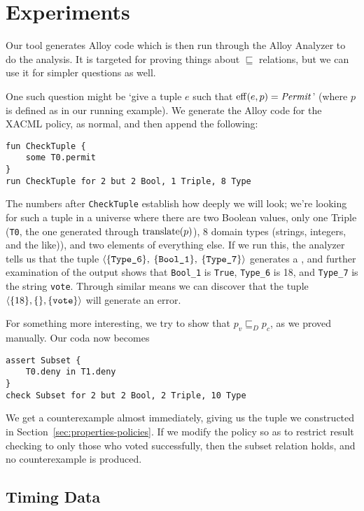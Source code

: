 \section{Experiments}
\label{sec:experiments}

Our tool generates Alloy code which is then run through the Alloy
Analyzer to do the analysis.  It is targeted for proving things about
$\sqsubseteq$ relations, but we can use it for simpler questions as
well.

One such question might be `give a tuple $e$ such that $\operatorname{eff} (e, p) =
\text{\textit{Permit}}$' (where $p$ is defined as in our running example).  We
generate the Alloy code for the XACML policy, as normal, and then
append the following:
\begin{verbatim}
fun CheckTuple {
    some T0.permit
}
run CheckTuple for 2 but 2 Bool, 1 Triple, 8 Type
\end{verbatim}
The numbers after \texttt{CheckTuple} establish how deeply we will
look; we're looking for such a tuple in a universe where there are two
Boolean values, only one Triple (\texttt{T0}, the one generated
through $\operatorname{translate}(p)$), 8 domain types (strings, integers, and the
like)), and two elements of everything else.  If we run this, the
analyzer tells us that the tuple $\langle \{ \text{\texttt{Type\_6}} \},$ $\{
\text{\texttt{Bool\_1}} \},$ $\{ \text{\texttt{Type\_7}} \} \rangle$ generates a
\Permit{}, and further examination of the output shows that
\texttt{Bool\_1} is \texttt{True}, \texttt{Type\_6} is 18, and
\texttt{Type\_7} is the string \texttt{vote}.  Through similar means
we can discover that the tuple $\langle \{ 18 \}, \{ \}, \{ \text{\texttt{vote}}
\} \rangle$ will generate an error.

For something more interesting, we try to show that $p_v \sqsubseteq_D
p_c$, as we proved manually.  Our coda now becomes
\begin{verbatim}
assert Subset {
    T0.deny in T1.deny
}
check Subset for 2 but 2 Bool, 2 Triple, 10 Type
\end{verbatim}
We get a counterexample almost immediately, giving us the tuple we
constructed in Section~\ref{sec:properties-policies}.  If we modify
the policy so as to restrict result checking to only those who voted
successfully, then the subset relation holds, and no counterexample is
produced.

\subsection{Timing Data}

